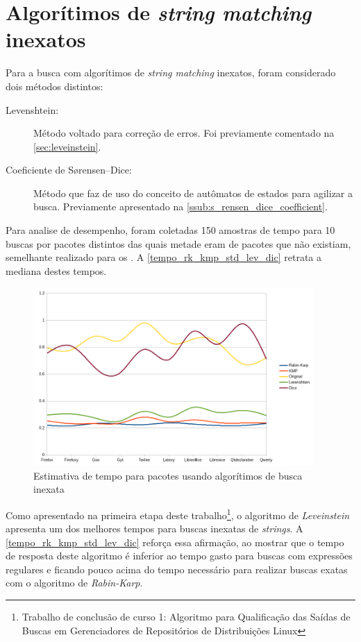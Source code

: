 \section{Algorítimos de \textit{string matching} inexatos} %
\label{sec:algor_timos_de_string_matching_inexatos}

Para a busca com algorítimos de \textit{string matching} inexatos, foram considerado dois métodos distintos:

\begin{description}
	\item[Levenshtein:] Método voltado para correção de erros. Foi previamente comentado na \autoref{sec:leveinstein}.
	\item[Coeficiente de Sørensen–Dice:] Método que faz de uso do conceito de autômatos de estados para agilizar a busca. Previamente apresentado na \autoref{ssub:s_rensen_dice_coefficient}.
\end{description}

Para analise de desempenho, foram coletadas 150 amostras de tempo para 10 buscas por pacotes distintos das quais metade eram de pacotes que não existiam, semelhante realizado para os . A \autoref{tempo_rk_kmp_std_lev_dic} retrata a mediana destes tempos.

\begin{figure}[htbp]
  \centering
  \includegraphics[width=0.95\textwidth]{figuras/tempo-rk_kmp_std_lev_dice}
  \caption{Estimativa de tempo para pacotes usando algorítimos de busca inexata}
  \label{tempo_rk_kmp_std_lev_dic}
\end{figure}

Como apresentado na primeira etapa deste trabalho\footnote{Trabalho de conclusão de curso 1: Algoritmo para Qualificação das Saídas de Buscas em
Gerenciadores de Repositórios de Distribuições Linux}, o algoritmo de \textit{Leveinstein} apresenta um dos melhores tempos para buscas inexatas de \textit{strings}. A \autoref{tempo_rk_kmp_std_lev_dic} reforça essa afirmação, ao mostrar que o tempo de resposta deste algoritmo é inferior ao tempo gasto para buscas com expressões regulares e ficando pouco acima do tempo necessário para realizar buscas exatas com o algoritmo de  \textit{Rabin-Karp}.